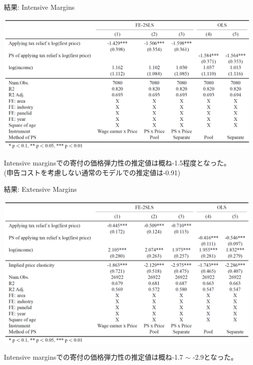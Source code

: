 \documentclass[dvipdfmx,10pt]{beamer}
\begin{document}
\begin{frame}{結果: Intensive Margins}
	\begin{table}
		\centering
		\includegraphics[width=0.9\linewidth]{Tab_res_1}
		\caption{First-Price Elasticities (Intensive Margins)}
		\label{tab:2}
	\end{table}
Intensive marginsでの寄付の価格弾力性の推定値は概ね-1.5程度となった。\\
(申告コストを考慮しない通常のモデルでの推定値は-0.91)
\end{frame}

\begin{frame}{結果: Extensive Margins}
	\begin{table}
		\centering
		\includegraphics[width=0.9\linewidth]{Tab_res_2}
		\caption{First-Price Elasticities (Extensive Margins)}
		\label{tab:3}
	\end{table}
	Intensive marginsでの寄付の価格弾力性の推定値は概ね-1.7 $\sim$ -2.9となった。
\end{frame}
\end{document}
